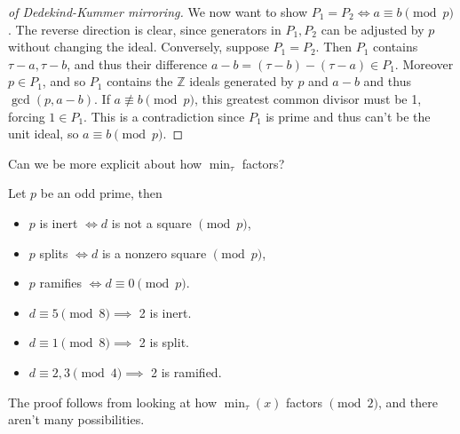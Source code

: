 \begin{proof}[of Dedekind-Kummer mirroring]
We now want to show \(P_1 = P_2 \iff a\equiv b \pmod p\). The reverse
direction is clear, since generators in \(P_1, P_2\) can be adjusted by
\(p\) without changing the ideal. Conversely, suppose \(P_1 = P_2\).
Then \(P_1\) contains \(\tau - a, \tau - b\), and thus their difference
\(a-b = (\tau -b ) - (\tau - a) \in P_1\). Moreover \(p\in P_1\), and so
\(P_1\) contains the \({\mathbb{Z}}\) ideals generated by \(p\) and
\(a-b\) and thus \(\gcd(p, a-b)\). If \(a \not\equiv b\pmod p\), this
greatest common divisor must be 1, forcing \(1\in P_1\). This is a
contradiction since \(P_1\) is prime and thus can't be the unit ideal,
so \(a \equiv b \pmod p\).

\end{proof}

\begin{question}

Can we be more explicit about how \(\min_\tau\) factors?

\end{question}

\begin{proposition}[?]

Let \(p\) be an odd prime, then

\begin{itemize}
\tightlist
\item
  \(p\) is inert \(\iff d\) is not a square \(\pmod p\),
\item
  \(p\) splits \(\iff d\) is a nonzero square \(\pmod p\),
\item
  \(p\) ramifies \(\iff d \equiv 0 \pmod p\).
\end{itemize}

\end{proposition}

\begin{proposition}[?]

\envlist

\begin{itemize}
\tightlist
\item
  \(d \equiv 5 \pmod 8 \implies\) 2 is inert.
\item
  \(d \equiv 1 \pmod 8 \implies\) 2 is split.
\item
  \(d \equiv 2, 3 \pmod 4 \implies\) 2 is ramified.
\end{itemize}

\end{proposition}

\begin{remark}

The proof follows from looking at how \(\min_\tau(x)\) factors
\(\pmod 2\), and there aren't many possibilities.

\end{remark}

